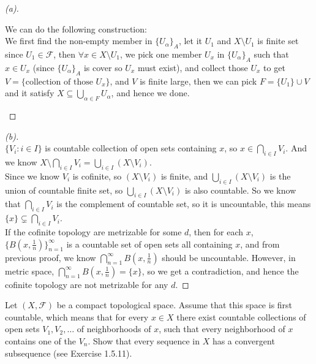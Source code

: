 \begin{proof}[(a)]
\begin{itemize}
        We can do the following construction: \\
        We first find the non-empty member in $\{U_{\alpha}\}_A$, let it $U_1$ and $X \setminus U_1$ is finite set since $U_1 \in \mathcal{F}$, then $\forall x \in X \setminus U_1$, we pick one member $U_x$ in $\{U_{\alpha}\}_A$ such that $x \in U_x$ (since $\{U_{\alpha}\}_A$ is cover so $U_x$ must exist), and collect those $U_x$ to get $V = \{\text{collection of those }U_x\}$, and $V$ is finite large, then we can pick $F = \{U_1\} \cup V$ and it satisfy $X \subseteq \bigcup_{\alpha \in F} U_{\alpha}$, and hence we done.
    \end{itemize}
\end{proof}
\begin{proof}[(b)]
    \vphantom{text} \\
    $\{V_i : i\in I\}$ is countable collection of open sets containing $x$, so $x \in \bigcap_{i \in I} V_i$.
    And we know $X \setminus \bigcap_{i \in I} V_i = \bigcup_{i \in I}(X \setminus V_i)$. \\
    Since we know $V_i$ is cofinite, so $(X \setminus V_i)$ is finite, and $\bigcup_{i \in I}(X \setminus V_i)$ is the union of countable finite set, so $\bigcup_{i \in I}(X \setminus V_i)$ is also countable.
    So we know that $\bigcap_{i \in I} V_i$ is the complement of countable set, so it is uncountable, this means $\{x\} \subsetneq \bigcap_{i \in I} V_i$. \\
    If the cofinite topology are metrizable for some $d$, then for each $x$, $\{B(x, \tfrac{1}{n})\}_{n=1}^{\infty}$ is a countable set of open sets all containing $x$, and from previous proof, we know $\bigcap_{n=1}^{\infty}B(x, \tfrac{1}{n})$ should be uncountable. However, in metric space, $\bigcap_{n=1}^{\infty}B(x, \tfrac{1}{n}) = \{x\}$, so we get a contradiction, and hence the cofinite topology are not metrizable for any $d$.
\end{proof}
\begin{problem}[15pts]
    Let $(X, \mathcal{F})$ be a compact topological space.  
Assume that this space is first countable, which means that for every $x \in X$ there exist countable collections of open sets $V_1, V_2, \ldots$ of neighborhoods of $x$, such that every neighborhood of $x$ contains one of the $V_n$.  
Show that every sequence in $X$ has a convergent subsequence
 (see Exercise 1.5.11).
\end{problem}

